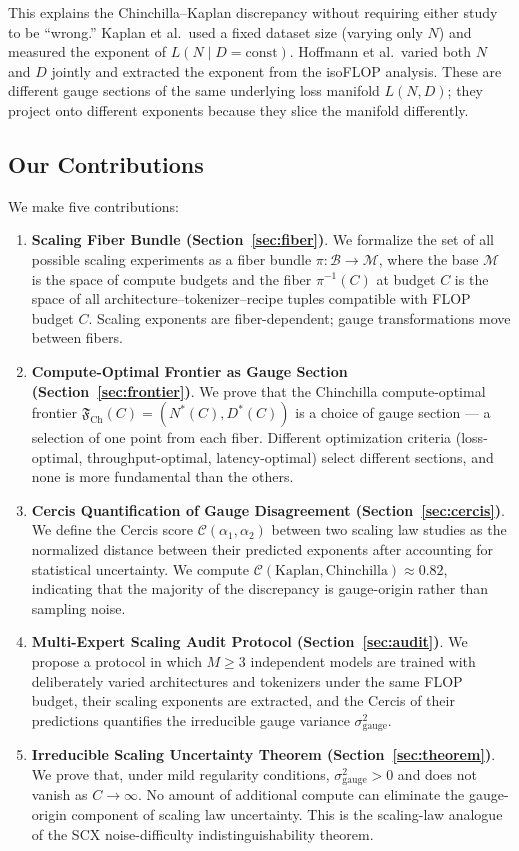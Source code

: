 \documentclass[12pt,a4paper]{article}
\theoremstyle{remark}
\newcommand{\cercis}{\mathcal{C}}
\newcommand{\Frontier}{\mathfrak{F}}
\newcommand{\Loss}{L}
\begin{document}
This explains the Chinchilla--Kaplan discrepancy without requiring either study to be ``wrong.'' Kaplan et al.\ used a fixed dataset size (varying only $N$) and measured the exponent of $L(N \mid D = \text{const})$. Hoffmann et al.\ varied both $N$ and $D$ jointly and extracted the exponent from the isoFLOP analysis. These are different gauge sections of the same underlying loss manifold $\Loss(N, D)$; they project onto different exponents because they slice the manifold differently.

\subsection{Our Contributions}

We make five contributions:

\begin{enumerate}[label=C\arabic*:, leftmargin=*]
    \item \textbf{Scaling Fiber Bundle (Section~\ref{sec:fiber})}. We formalize the set of all possible scaling experiments as a fiber bundle $\pi: \mathcal{B} \to \mathcal{M}$, where the base $\mathcal{M}$ is the space of compute budgets and the fiber $\pi^{-1}(C)$ at budget $C$ is the space of all architecture--tokenizer--recipe tuples compatible with FLOP budget $C$. Scaling exponents are fiber-dependent; gauge transformations move between fibers.
    \item \textbf{Compute-Optimal Frontier as Gauge Section (Section~\ref{sec:frontier})}. We prove that the Chinchilla compute-optimal frontier $\Frontier_{\text{Ch}}(C) = (N^*(C), D^*(C))$ is a choice of gauge section — a selection of one point from each fiber. Different optimization criteria (loss-optimal, throughput-optimal, latency-optimal) select different sections, and none is more fundamental than the others.
    \item \textbf{Cercis Quantification of Gauge Disagreement (Section~\ref{sec:cercis})}. We define the Cercis score $\cercis(\alpha_1, \alpha_2)$ between two scaling law studies as the normalized distance between their predicted exponents after accounting for statistical uncertainty. We compute $\cercis(\text{Kaplan}, \text{Chinchilla}) \approx 0.82$, indicating that the majority of the discrepancy is gauge-origin rather than sampling noise.
    \item \textbf{Multi-Expert Scaling Audit Protocol (Section~\ref{sec:audit})}. We propose a protocol in which $M \geq 3$ independent models are trained with deliberately varied architectures and tokenizers under the same FLOP budget, their scaling exponents are extracted, and the Cercis of their predictions quantifies the irreducible gauge variance $\sigma^2_{\text{gauge}}$.
    \item \textbf{Irreducible Scaling Uncertainty Theorem (Section~\ref{sec:theorem})}. We prove that, under mild regularity conditions, $\sigma^2_{\text{gauge}} > 0$ and does not vanish as $C \to \infty$. No amount of additional compute can eliminate the gauge-origin component of scaling law uncertainty. This is the scaling-law analogue of the SCX noise-difficulty indistinguishability theorem.
\end{enumerate}
\end{document}
